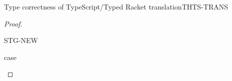 \documentclass[acmlarge, anonymous, authordraft]{acmart}
\begin{document}
\begin{lemma}{Type correctness of TypeScript/Typed Racket translation}{THTS-TRANS}
\begin{proof}
    \begin{case}{STG-NEW}
      \begin{steps}{case}
	\step{\Class \C {\b\fd}{\b\md} $\in$ \K}
      \end{steps}
      \begin{steps}{}
      \end{steps}
    \end{case}
  
  \end{proof}
\end{lemma}
\end{document}
